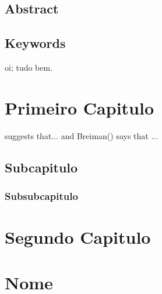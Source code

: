 \documentclass[12pt,openright,twoside,a4paper,brazil,english,emptypage,openany]{abntex2}
\makeatletter
\renewcommand{\tableofcontents}{%
  \chapter*{\MakeUppercase\contentsname}
  \@starttoc{toc}
}
\makeatother
\begin{document}
\lipsum[1]

\newpage

\section*{Abstract}
\justifying

\lipsum[1]

\vspace{4\onelineskip}
\noindent
\section*{Keywords}
\hspace{1em} oi; tudo bem.


\tableofcontents



\rmfamily %

\chapter{Primeiro Capitulo}
\justifying

\lipsum[1]

\cite{elliott2013complete} suggests that... and Breiman(\citeyear{elliott2013complete}) says that ...

\section{Subcapitulo}
\justifying

\lipsum[1]

\subsection{Subsubcapitulo}
\justifying

\lipsum[1]

\chapter{Segundo Capitulo}
\justifying

\lipsum[1]





\appendix

\chapter{Nome}
\justifying
\end{document}
